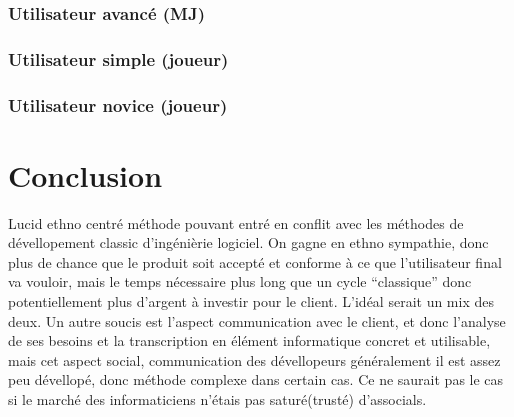 \documentclass[11pt,a4paper]{report}
\begin{document}
\subsubsection{Utilisateur avancé (MJ)}

\subsubsection{Utilisateur simple (joueur)}

\subsubsection{Utilisateur novice (joueur)}
  

\section{Conclusion}
Lucid ethno centré
méthode pouvant entré en conflit avec les méthodes de dévellopement classic
d'ingénièrie logiciel.
On gagne en ethno sympathie, donc plus de chance que le produit soit accepté et
conforme à ce que l'utilisateur final va vouloir, mais le temps nécessaire plus
long que un cycle ``classique'' donc potentiellement plus d'argent à investir
pour le client. L'idéal serait un mix des deux.
Un autre soucis est l'aspect communication avec le client, et donc l'analyse de
ses besoins et la transcription en élément informatique concret et utilisable,
mais cet aspect social, communication des dévellopeurs généralement il est assez
peu dévellopé, donc méthode complexe dans certain cas. Ce ne saurait pas le cas
si le marché des informaticiens n'étais pas saturé(trusté) d'associals. 
  
  
\end{document}

